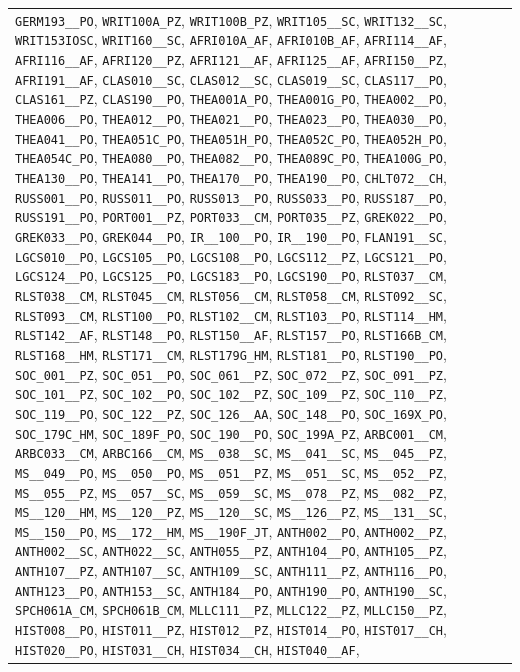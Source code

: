\begin{longtable}{|p{4.4in}|p{4.4in}|}
\verb|GERM193__PO|, \verb|WRIT100A_PZ|, \verb|WRIT100B_PZ|, \verb|WRIT105__SC|, \verb|WRIT132__SC|, \verb|WRIT153IOSC|, \verb|WRIT160__SC|, \verb|AFRI010A_AF|, \verb|AFRI010B_AF|, \verb|AFRI114__AF|, \verb|AFRI116__AF|, \verb|AFRI120__PZ|, \verb|AFRI121__AF|, \verb|AFRI125__AF|, \verb|AFRI150__PZ|, \verb|AFRI191__AF|, \verb|CLAS010__SC|, \verb|CLAS012__SC|, \verb|CLAS019__SC|, \verb|CLAS117__PO|, \verb|CLAS161__PZ|, \verb|CLAS190__PO|, \verb|THEA001A_PO|, \verb|THEA001G_PO|, \verb|THEA002__PO|, \verb|THEA006__PO|, \verb|THEA012__PO|, \verb|THEA021__PO|, \verb|THEA023__PO|, \verb|THEA030__PO|, \verb|THEA041__PO|, \verb|THEA051C_PO|, \verb|THEA051H_PO|, \verb|THEA052C_PO|, \verb|THEA052H_PO|, \verb|THEA054C_PO|, \verb|THEA080__PO|, \verb|THEA082__PO|, \verb|THEA089C_PO|, \verb|THEA100G_PO|, \verb|THEA130__PO|, \verb|THEA141__PO|, \verb|THEA170__PO|, \verb|THEA190__PO|, \verb|CHLT072__CH|, \verb|RUSS001__PO|, \verb|RUSS011__PO|, \verb|RUSS013__PO|, \verb|RUSS033__PO|, \verb|RUSS187__PO|, \verb|RUSS191__PO|, \verb|PORT001__PZ|, \verb|PORT033__CM|, \verb|PORT035__PZ|, \verb|GREK022__PO|, \verb|GREK033__PO|, \verb|GREK044__PO|, \verb|IR__100__PO|, \verb|IR__190__PO|, \verb|FLAN191__SC|, \verb|LGCS010__PO|, \verb|LGCS105__PO|, \verb|LGCS108__PO|, \verb|LGCS112__PZ|, \verb|LGCS121__PO|, \verb|LGCS124__PO|, \verb|LGCS125__PO|, \verb|LGCS183__PO|, \verb|LGCS190__PO|, \verb|RLST037__CM|, \verb|RLST038__CM|, \verb|RLST045__CM|, \verb|RLST056__CM|, \verb|RLST058__CM|, \verb|RLST092__SC|, \verb|RLST093__CM|, \verb|RLST100__PO|, \verb|RLST102__CM|, \verb|RLST103__PO|, \verb|RLST114__HM|, \verb|RLST142__AF|, \verb|RLST148__PO|, \verb|RLST150__AF|, \verb|RLST157__PO|, \verb|RLST166B_CM|, \verb|RLST168__HM|, \verb|RLST171__CM|, \verb|RLST179G_HM|, \verb|RLST181__PO|, \verb|RLST190__PO|, \verb|SOC_001__PZ|, \verb|SOC_051__PO|, \verb|SOC_061__PZ|, \verb|SOC_072__PZ|, \verb|SOC_091__PZ|, \verb|SOC_101__PZ|, \verb|SOC_102__PO|, \verb|SOC_102__PZ|, \verb|SOC_109__PZ|, \verb|SOC_110__PZ|, \verb|SOC_119__PO|, \verb|SOC_122__PZ|, \verb|SOC_126__AA|, \verb|SOC_148__PO|, \verb|SOC_169X_PO|, \verb|SOC_179C_HM|, \verb|SOC_189F_PO|, \verb|SOC_190__PO|, \verb|SOC_199A_PZ|, \verb|ARBC001__CM|, \verb|ARBC033__CM|, \verb|ARBC166__CM|, \verb|MS__038__SC|, \verb|MS__041__SC|, \verb|MS__045__PZ|, \verb|MS__049__PO|, \verb|MS__050__PO|, \verb|MS__051__PZ|, \verb|MS__051__SC|, \verb|MS__052__PZ|, \verb|MS__055__PZ|, \verb|MS__057__SC|, \verb|MS__059__SC|, \verb|MS__078__PZ|, \verb|MS__082__PZ|, \verb|MS__120__HM|, \verb|MS__120__PZ|, \verb|MS__120__SC|, \verb|MS__126__PZ|, \verb|MS__131__SC|, \verb|MS__150__PO|, \verb|MS__172__HM|, \verb|MS__190F_JT|, \verb|ANTH002__PO|, \verb|ANTH002__PZ|, \verb|ANTH002__SC|, \verb|ANTH022__SC|, \verb|ANTH055__PZ|, \verb|ANTH104__PO|, \verb|ANTH105__PZ|, \verb|ANTH107__PZ|, \verb|ANTH107__SC|, \verb|ANTH109__SC|, \verb|ANTH111__PZ|, \verb|ANTH116__PO|, \verb|ANTH123__PO|, \verb|ANTH153__SC|, \verb|ANTH184__PO|, \verb|ANTH190__PO|, \verb|ANTH190__SC|, \verb|SPCH061A_CM|, \verb|SPCH061B_CM|, \verb|MLLC111__PZ|, \verb|MLLC122__PZ|, \verb|MLLC150__PZ|, \verb|HIST008__PO|, \verb|HIST011__PZ|, \verb|HIST012__PZ|, \verb|HIST014__PO|, \verb|HIST017__CH|, \verb|HIST020__PO|, \verb|HIST031__CH|, \verb|HIST034__CH|, \verb|HIST040__AF|, 
\end{longtable}
